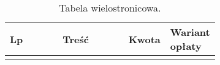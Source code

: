 \begin{longtable}{| c | m{0.58\linewidth} | r | m{0.1\linewidth} |}
    \caption{Tabela wielostronicowa.}
    \label{table:koszty}                                                                                                                                                                                               \\

    \hline
    Lp & \multicolumn{1}{c|}{Treść}                                                                                                  & \multicolumn{1}{c|}{Kwota} & \multicolumn{1}{m{0.1\linewidth}|}{Wariant opłaty} \\ \hline\hline \endfirsthead \endfoot
    \hline \endlastfoot


\end{longtable}
